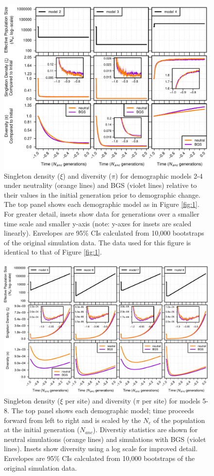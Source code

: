 \documentclass[9pt,twocolumn,twoside]{rilabRxiv}
\begin{document}
\begin{figure}[t]
\includegraphics[width=.9\linewidth]{figures/FigS9.pdf}
\caption{Singleton density ($\xi$) and diversity ($\pi$) for demographic models 2-4 under neutrality (orange lines) and BGS (violet lines) relative to their values in the initial generation prior to demographic change.
The top panel shows each demographic model as in Figure \ref{fig:1}.
For greater detail, insets show data for generations over a smaller time scale and smaller y-axis (note: y-axes for insets are scaled linearly).
Envelopes are 95\% CIs calculated from 10,000 bootstraps of the original simulation data.
The data used for this figure is identical to that of Figure \ref{fig:1}.}
\label{fig:S9}
\end{figure}
\pagebreak

\begin{figure}[t]
\includegraphics[width=\linewidth]{figures/FigS4.pdf}
\caption{Singleton density ($\xi$ per site) and diversity ($\pi$ per site) for models 5-8.
The top panel shows each demographic model; time proceeds forward from left to right and is scaled by the $N_e$ of the population at the initial generation ($N_{anc}$).
Diverstiy statistics are shown for neutral simulations (orange lines) and simulations with BGS (violet lines).
Insets show diversity using a log scale for improved detail.
Envelopes are 95\% CIs calculated from 10,000 bootstraps of the original simulation data.}
\label{fig:S4}
\end{figure}
\pagebreak
\end{document}
